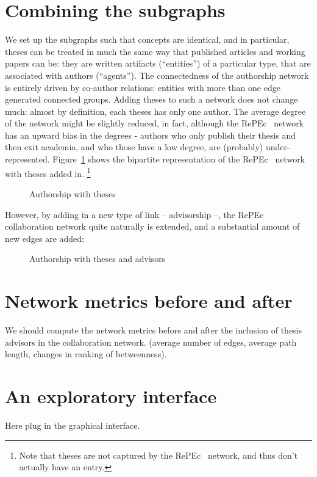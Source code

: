 \documentclass[x11names]{article}
\newcommand{\repec}{RePEc}
\begin{document}
\section{Combining the subgraphs}
\label{sec:combine}
We set up the subgraphs such that concepts are identical, and in particular, theses can be treated in much the same way that published articles and working papers can be: they are written artifacts (``entities'') of a particular type, that are associated with authors (``agents''). The connectedness of the authorship network is entirely driven by co-author relations: entities with more than one edge generated connected groups. Adding theses to such a network does not change much: almost by definition, each theses has only one author. The average degree of the network might be slightly reduced, in fact, although the \repec~ network has an upward bias in the degrees - authors who only publish their thesis and then exit academia, and who those have a low degree, are (probably) under-represented. Figure~\ref{fig:author:theses} shows the bipartite representation of the \repec~ network with theses added in.%
\footnote{Note that theses are not captured by the \repec~ network, and thus don't actually have an entry.}

\begin{figure}[ht]
\caption{Authorship with theses}\label{fig:author:theses}

\end{figure}

However, by adding in a new type of link -- advisorship --, the \repec~ collaboration network quite naturally is extended, and a substantial amount of new edges are added:
\begin{figure}[ht]
\caption{Authorship with theses and advisors}\label{fig:author:theses:complete}

\end{figure}

\section{Network metrics before and after}
\label{sec:metrics}

We should compute the network metrics before and after the inclusion of thesis advisors in the collaboration network. (average number of edges, average path length, changes in ranking of betweenness).

\section{An exploratory interface}
\label{sec:interface}
Here plug in the graphical interface.
\end{document}
